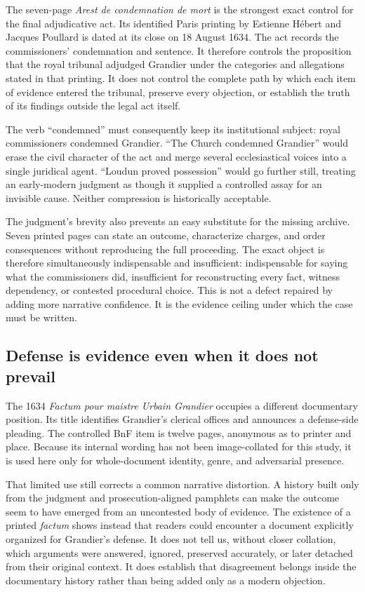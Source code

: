 The seven-page \emph{Arest de condemnation de mort} is the strongest exact
control for the final adjudicative act.  Its identified Paris printing by
Estienne Hébert and Jacques Poullard is dated at its close on 18 August 1634.
The act records the commissioners' condemnation and sentence.  It therefore
controls the proposition that the royal tribunal adjudged Grandier under the
categories and allegations stated in that printing.  It does not control the
complete path by which each item of evidence entered the tribunal, preserve
every objection, or establish the truth of its findings outside the legal act
itself.

The verb ``condemned'' must consequently keep its institutional subject:
royal commissioners condemned Grandier.  ``The Church condemned Grandier''
would erase the civil character of the act and merge several ecclesiastical
voices into a single juridical agent.  ``Loudun proved possession'' would go
further still, treating an early-modern judgment as though it supplied a
controlled assay for an invisible cause.  Neither compression is historically
acceptable.

The judgment's brevity also prevents an easy substitute for the missing
archive.  Seven printed pages can state an outcome, characterize charges, and
order consequences without reproducing the full proceeding.  The exact object
is therefore simultaneously indispensable and insufficient: indispensable
for saying what the commissioners did, insufficient for reconstructing every
fact, witness dependency, or contested procedural choice.  This is not a
defect repaired by adding more narrative confidence.  It is the evidence
ceiling under which the case must be written.

\subsection{Defense is evidence even when it does not prevail}

The 1634 \emph{Factum pour maistre Urbain Grandier} occupies a different
documentary position.  Its title identifies Grandier's clerical offices and
announces a defense-side pleading.  The controlled BnF item is twelve pages,
anonymous as to printer and place.  Because its internal wording has not been
image-collated for this study, it is used here only for whole-document
identity, genre, and adversarial presence.

That limited use still corrects a common narrative distortion.  A history
built only from the judgment and prosecution-aligned pamphlets can make the
outcome seem to have emerged from an uncontested body of evidence.  The
existence of a printed \emph{factum} shows instead that readers could encounter
a document explicitly organized for Grandier's defense.  It does not tell us,
without closer collation, which arguments were answered, ignored, preserved
accurately, or later detached from their original context.  It does establish
that disagreement belongs inside the documentary history rather than being
added only as a modern objection.

